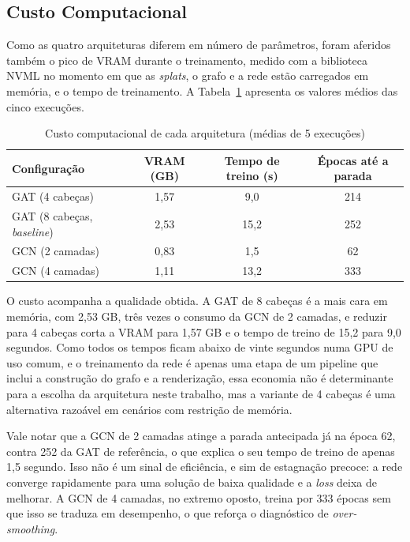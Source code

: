\subsection{Custo Computacional}

Como as quatro arquiteturas diferem em número de parâmetros, foram aferidos também o pico de VRAM durante o treinamento, medido com a biblioteca NVML no momento em que as \emph{splats}, o grafo e a rede estão carregados em memória, e o tempo de treinamento. A Tabela~\ref{tab:custo_experimento3} apresenta os valores médios das cinco execuções.

\begin{table}[h]
\centering
\caption{Custo computacional de cada arquitetura (médias de 5 execuções)}
\label{tab:custo_experimento3}
\begin{tabular}{lccc}
\hline
\textbf{Configuração} & \textbf{VRAM (GB)} & \textbf{Tempo de treino (s)} & \textbf{Épocas até a parada} \\
\hline
GAT (4 cabeças) & 1{,}57 & 9{,}0 & 214 \\
GAT (8 cabeças, \textit{baseline}) & 2{,}53 & 15{,}2 & 252 \\
GCN (2 camadas) & 0{,}83 & 1{,}5 & 62 \\
GCN (4 camadas) & 1{,}11 & 13{,}2 & 333 \\
\hline
\end{tabular}
\end{table}

O custo acompanha a qualidade obtida. A GAT de 8 cabeças é a mais cara em memória, com 2,53 GB, três vezes o consumo da GCN de 2 camadas, e reduzir para 4 cabeças corta a VRAM para 1,57 GB e o tempo de treino de 15,2 para 9,0 segundos. Como todos os tempos ficam abaixo de vinte segundos numa GPU de uso comum, e o treinamento da rede é apenas uma etapa de um pipeline que inclui a construção do grafo e a renderização, essa economia não é determinante para a escolha da arquitetura neste trabalho, mas a variante de 4 cabeças é uma alternativa razoável em cenários com restrição de memória.

Vale notar que a GCN de 2 camadas atinge a parada antecipada já na época 62, contra 252 da GAT de referência, o que explica o seu tempo de treino de apenas 1,5 segundo. Isso não é um sinal de eficiência, e sim de estagnação precoce: a rede converge rapidamente para uma solução de baixa qualidade e a \textit{loss} deixa de melhorar. A GCN de 4 camadas, no extremo oposto, treina por 333 épocas sem que isso se traduza em desempenho, o que reforça o diagnóstico de \textit{over-smoothing}.

